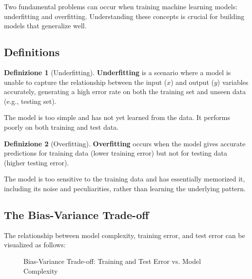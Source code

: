 \documentclass[11pt,a4paper]{article}
\theoremstyle{definition}
\newtheorem{definition}{Definizione}[section]
\theoremstyle{plain}
\theoremstyle{remark}
\begin{document}
Two fundamental problems can occur when training machine learning models: underfitting and overfitting. Understanding these concepts is crucial for building models that generalize well.

\subsection{Definitions}

\begin{definition}[Underfitting]
\textbf{Underfitting} is a scenario where a model is unable to capture the relationship between the input ($x$) and output ($y$) variables accurately, generating a high error rate on both the training set and unseen data (e.g., testing set).
\end{definition}

The model is too simple and has not yet learned from the data. It performs poorly on both training and test data.

\begin{definition}[Overfitting]
\textbf{Overfitting} occurs when the model gives accurate predictions for training data (lower training error) but not for testing data (higher testing error).
\end{definition}

The model is too sensitive to the training data and has essentially memorized it, including its noise and peculiarities, rather than learning the underlying pattern.

\subsection{The Bias-Variance Trade-off}

The relationship between model complexity, training error, and test error can be visualized as follows:

\begin{figure}[h]
\centering
{}
\caption{Bias-Variance Trade-off: Training and Test Error vs. Model Complexity}
\end{figure}
\end{document}

